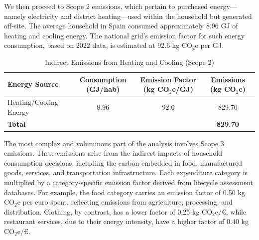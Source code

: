 \documentclass[12pt,a4paper]{article}%
\begin{document}
We then proceed to Scope 2 emissions, which pertain to purchased energy—namely electricity and district heating—used within the household but generated off-site. The average household in Spain consumed approximately 8.96 GJ of heating and cooling energy. The national grid's emission factor for such energy consumption, based on 2022 data, is estimated at 92.6 kg CO$_2$e per GJ.

\begin{table}[h]
\centering
\caption{Indirect Emissions from Heating and Cooling (Scope 2)}
\label{tab:scope2}
\begin{tabular}{|l|c|c|c|}
\hline
\textbf{Energy Source} & \textbf{Consumption (GJ/hab)} & \textbf{Emission Factor (kg CO$_2$e/GJ)} & \textbf{Emissions (kg CO$_2$e)} \\
\hline
Heating/Cooling Energy & 8.96 & 92.6 & 829.70 \\
\hline
\textbf{Total} & & & \textbf{829.70} \\
\hline
\end{tabular}
\end{table}

The most complex and voluminous part of the analysis involves Scope 3 emissions. These emissions arise from the indirect impacts of household consumption decisions, including the carbon embedded in food, manufactured goods, services, and transportation infrastructure. Each expenditure category is multiplied by a category-specific emission factor derived from lifecycle assessment databases. For example, the food category carries an emission factor of 0.50 kg CO$_2$e per euro spent, reflecting emissions from agriculture, processing, and distribution. Clothing, by contrast, has a lower factor of 0.25 kg CO$_2$e/€, while restaurant services, due to their energy intensity, have a higher factor of 0.40 kg CO$_2$e/€.
\end{document}
